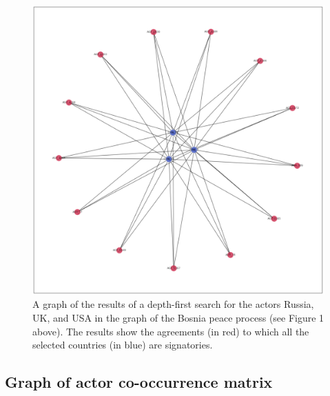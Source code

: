 \documentclass{article}
\begin{document}
\begin{figure}[H]
\begin{center}
\includegraphics[scale=0.50]{./assets/bosnia_query.png}
\end{center}
\caption{A graph of the results of a depth-first search for the actors Russia, UK, and USA in the graph of the Bosnia peace process (see Figure 1 above). The results show the agreements (in red) to which all the selected countries (in blue) are signatories.}
\end{figure}

\subsection{Graph of actor co-occurrence matrix}
\end{document}
